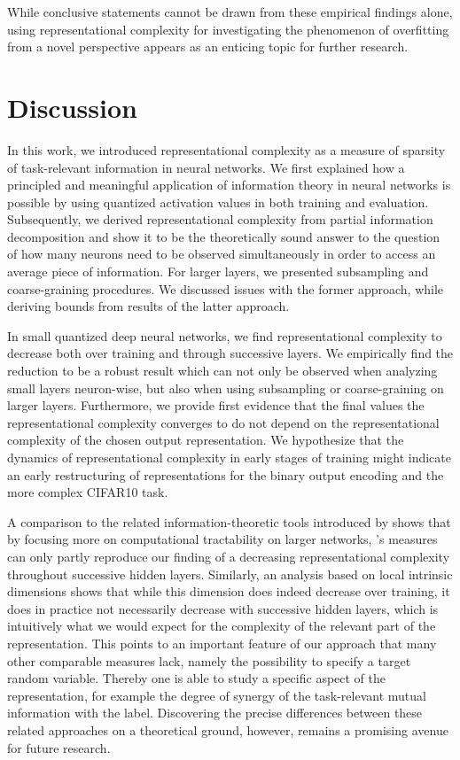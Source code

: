 \documentclass[10pt]{article}
\theoremstyle{definition}
\theoremstyle{plain}
\begin{document}
While conclusive statements cannot be drawn from these empirical findings alone, using representational complexity for investigating the phenomenon of overfitting from a novel perspective appears as an enticing topic for further research.

\section{Discussion}

In this work, we introduced representational complexity as a measure of sparsity of task-relevant information in neural networks. We first explained how a principled and meaningful application of information theory in neural networks is possible by using quantized activation values in both training and evaluation. Subsequently, we derived representational complexity from partial information decomposition and show it to be the theoretically sound answer to the question of how many neurons need to be observed simultaneously in order to access an average piece of information. For larger layers, we presented subsampling and coarse-graining procedures. We discussed issues with the former approach, while deriving bounds from results of the latter approach.

In small quantized deep neural networks, we find representational complexity to decrease both over training and through successive layers. We empirically find the reduction to be a robust result which can not only be observed when analyzing small layers neuron-wise, but also when using subsampling or coarse-graining on larger layers. Furthermore, we provide first evidence that the final values the representational complexity converges to do not depend on the representational complexity of the chosen output representation. We hypothesize that the dynamics of representational complexity in early stages of training might indicate an early restructuring of representations for the binary output encoding and the more complex CIFAR10 task.

A comparison to the related information-theoretic tools introduced by \cite{reing_discovering_2021} shows that by focusing more on computational tractability on larger networks, \citeauthor{reing_discovering_2021}'s measures can only partly reproduce our finding of a decreasing representational complexity throughout successive hidden layers. Similarly, an analysis based on local intrinsic dimensions \citep{fukunaga1971algorithm} shows that while this dimension does indeed decrease over training, it does in practice not necessarily decrease with successive hidden layers, which is intuitively what we would expect for the complexity of the relevant part of the representation. This points to an important feature of our approach that many other comparable measures lack, namely the possibility to specify a target random variable. Thereby one is able to study a specific aspect of the representation, for example the degree of synergy of the task-relevant mutual information with the label. Discovering the precise differences between these related approaches on a theoretical ground, however, remains a promising avenue for future research.
\end{document}
